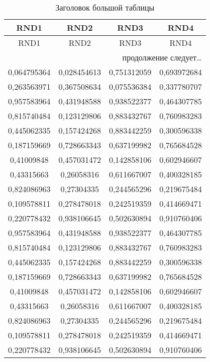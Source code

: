 \begin{longtable}{|c|c|c|c|}
    \caption[Заголовок большой таблицы, который будет в списке таблиц]{Заголовок большой таблицы}
    \\ \hline
    \textbf{RND1} & \textbf{RND2} & \textbf{RND3} & \textbf{RND4} \\ \hline
    \endfirsthead
    \hline
    RND1          & RND2          & RND3          & RND4          \\ \hline
    \endhead
    \hline
    \multicolumn{4}{r}{продолжение следует\ldots} \
    \endfoot
    \hline
    \endlastfoot
    0,576745371   & 0,435853468   & 0,36384912    & 0,299047979   \\
    0,064795364   & 0,028454613   & 0,751312059   & 0,693972684   \\
    0,263563971   & 0,367508634   & 0,075536384   & 0,337780707   \\
    0,957583964   & 0,431948588   & 0,938522377   & 0,464307785   \\
    0,815740484   & 0,123129806   & 0,883432767   & 0,760983283   \\
    0,445062335   & 0,157424268   & 0,883442259   & 0,300596338   \\
    0,187159669   & 0,728663343   & 0,637199982   & 0,765684528   \\
    0,41009848    & 0,457031472   & 0,142858106   & 0,602946607   \\
    0,43315663    & 0,26058316    & 0,611667007   & 0,400328185   \\
    0,824086963   & 0,27304335    & 0,244565296   & 0,219675484   \\
    0,109578811   & 0,278478018   & 0,242519359   & 0,414669471   \\
    0,220778432   & 0,938106645   & 0,502630894   & 0,910760406   \\
    0,957583964   & 0,431948588   & 0,938522377   & 0,464307785   \\
    0,815740484   & 0,123129806   & 0,883432767   & 0,760983283   \\
    0,445062335   & 0,157424268   & 0,883442259   & 0,300596338   \\
    0,187159669   & 0,728663343   & 0,637199982   & 0,765684528   \\
    0,41009848    & 0,457031472   & 0,142858106   & 0,602946607   \\
    0,43315663    & 0,26058316    & 0,611667007   & 0,400328185   \\
    0,824086963   & 0,27304335    & 0,244565296   & 0,219675484   \\
    0,109578811   & 0,278478018   & 0,242519359   & 0,414669471   \\
    0,220778432   & 0,938106645   & 0,502630894   & 0,910760406   \\
\end{longtable}

